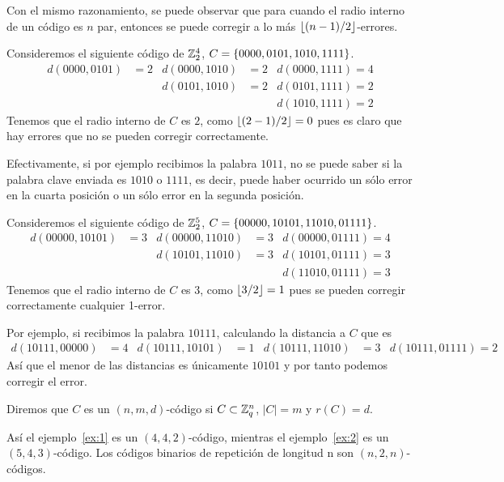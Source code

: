 Con el mismo razonamiento, se puede observar que para cuando el radio interno de un código es $n$ par, entonces se puede corregir a lo más $\lfloor (n-1)/2 \rfloor$-errores.
\begin{example}
	\label{ex:1}
	Consideremos el siguiente código de $\mathbb{Z}_2^4$, $C=\left\{0000, 0101, 1010, 1111\right\}$.
	\begin{align*}
		d(0000, 0101) &= 2 & d(0000, 1010) &= 2 & d(0000, 1111) = 4 \\
		& & d(0101, 1010) &= 2 & d(0101, 1111) = 2 \\
		& & & & d(1010, 1111) = 2
	\end{align*}
	Tenemos que el radio interno de $C$ es $2$, como $\lfloor (2-1)/2 \rfloor=0$ pues es claro que hay errores que no se pueden corregir correctamente.

	Efectivamente, si por ejemplo recibimos la palabra $1011$, no se puede saber si la palabra clave enviada es $1010$ o $1111$, es decir, puede haber ocurrido un sólo error en la cuarta posición o un sólo error en la segunda posición.
\end{example}

\begin{example}
	\label{ex:2}
	Consideremos el siguiente código de $\mathbb{Z}_2^5$, $C=\left\{00000, 10101, 11010, 01111\right\}$.
	\begin{align*}
		d(00000, 10101) &= 3 & d(00000, 11010) &= 3 & d(00000, 01111) = 4 \\
		& & d(10101, 11010) &= 3 & d(10101, 01111) = 3 \\
		& & & & d(11010, 01111) = 3
	\end{align*}
	Tenemos que el radio interno de $C$ es $3$, como $\lfloor 3/2 \rfloor=1$ pues se pueden corregir correctamente cualquier 1-error.

	Por ejemplo, si recibimos la palabra $10111$, calculando la distancia a $C$ que es
	\begin{align*}
		d(10111, 00000) &= 4 & d(10111, 10101) &= 1 & d(10111, 11010) &= 3 & d(10111, 01111) = 2
	\end{align*}
	Así que el menor de las distancias es únicamente $10101$ y por tanto podemos corregir el error.
\end{example}

\begin{definition}
	Diremos que $C$ es un $(n, m, d)$-código si $C\subset\mathbb{Z}_q^n$, $|C| = m$ y $r(C)=d$.
\end{definition}
Así el ejemplo~\ref{ex:1} es un $(4, 4, 2)$-código, mientras el ejemplo~\ref{ex:2} es un $(5, 4, 3)$-código.
Los códigos binarios de repetición de longitud n son $(n, 2, n)$-códigos.

